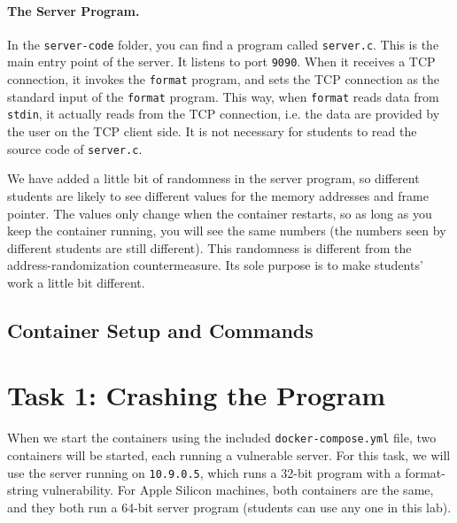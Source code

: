 \paragraph{The Server Program.}
In the \texttt{server-code} folder, you can find a program called \texttt{server.c}.
This is the main entry point of the server. It listens to port \texttt{9090}.
When it receives a TCP connection, it
invokes the \texttt{format} program, and sets the TCP connection
as the standard input of the \texttt{format} program. This way,
when \texttt{format} reads data from \texttt{stdin}, it actually
reads from the TCP connection, i.e. the data are provided by
the user on the TCP client side. It is not necessary for
students to read the source code of \texttt{server.c}.

We have added a little bit of randomness
in the server program, so different students are likely to see different values
for the memory addresses and frame pointer. The values only change
when the container restarts, so as long as you keep the
container running, you will see the same numbers (the numbers
seen by different students are still different). This randomness
is different from the address-randomization countermeasure. Its sole
purpose is to make students' work a little bit different.


\subsection{Container Setup and Commands}







\section{Task 1: Crashing the Program}

When we start the containers using the included
\texttt{docker-compose.yml} file, two containers will be
started, each running a vulnerable server. 
For this task, we will use the server running on \texttt{10.9.0.5}, 
which runs a 32-bit program with a format-string vulnerability. 
For Apple Silicon machines, both containers are the same, and 
they both run a 64-bit server program (students can use any one
in this lab).


